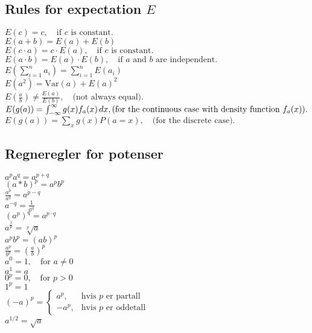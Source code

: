 \documentclass[a4paper,7pt,fleqn]{article}
\begin{document}
\begin{multicols}{3}
\begin{minipage}{\linewidth}
\end{minipage}



\begin{minipage}{\linewidth}
\subsection{Rules for expectation \(E\)} 
\(E(c) = c, \quad \text{if } c \text{ is constant.}\) \\
\(E(a + b) = E(a) + E(b)\) \\
\(E(c \cdot a) = c \cdot E(a), \quad \text{if } c \text{ is constant.}\) \\
\(E(a \cdot b) = E(a) \cdot E(b), \quad \text{if } a \text{ and } b \text{ are independent.}\) \\
\(E\left( \sum_{i=1}^n a_i \right) = \sum_{i=1}^n E(a_i)\) \\
\(E(a^2) = \text{Var}(a) + E(a)^2\) \\
\(E\left(\frac{a}{b}\right) \neq \frac{E(a)}{E(b)}, \quad \text{(not always equal).}\) \\
\(E(g(a)) = \int_{-\infty}^\infty g(x) f_a(x) \, dx, \quad \\ 
\text{(for the continuous case with density function } f_a(x)\text{).}\) \\
\(E(g(a)) = \sum_{x} g(x) P(a = x), \quad \text{(for the discrete case).}\)
\end{minipage}

\begin{minipage}{\linewidth}
\subsection{Regneregler for potenser}
\(a^p a^q = a^{p+q}\) \\
\((a*b)^p = a^p b^p\) \\
\(\frac{a^p}{a^q} = a^{p-q}\) \\
\(a^{-q} = \frac{1}{a^q}\) \\
\((a^p)^q = a^{p \cdot q}\) \\
\(a^{\frac{1}{p}} = \sqrt[p]{a}\) \\
\(a^p b^p = (ab)^p\) \\
\(\frac{a^p}{b^p} = \left(\frac{a}{b}\right)^p\) \\
\(a^0 = 1, \quad \text{for } a \neq 0\) \\
\(a^1 = a\) \\
\(0^p = 0, \quad \text{for } p > 0\) \\
\(1^p = 1\) \\
\((-a)^p = 
\begin{cases} 
    a^p, & \text{hvis } p \text{ er partall} \\
    -a^p, & \text{hvis } p \text{ er oddetall} 
\end{cases}\) \\
\(a^{1/2} = \sqrt{a}\)
\end{minipage}


\end{multicols}
\end{document}
